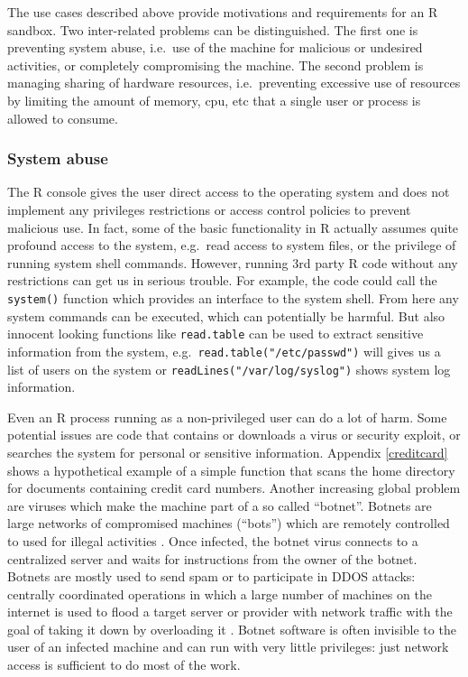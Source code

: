 \documentclass[article]{jss}
\newcommand{\R}{\textsf{R}\xspace}
\begin{document}
The use cases described above provide motivations and requirements for an
\R sandbox. Two inter-related problems can be distinguished. The first
one is preventing system abuse, i.e.\ use of the machine for malicious or
undesired activities, or completely compromising the machine. The second
problem is managing sharing of hardware resources, i.e.\ preventing excessive
use of resources by limiting the amount of memory, cpu, etc that a single user
or process is allowed to consume.

\subsubsection{System abuse}

The \R console gives the user direct access to the operating system
and does not implement any privileges restrictions or access control policies to
prevent malicious use. In fact, some of the basic functionality in \R actually
assumes quite profound access to the system, e.g.\ read access to system files,
or the privilege of running system shell commands. However, running 3rd
party \R code without any restrictions can get us in serious
trouble. For example, the code could call the \texttt{system()} function which
provides an interface to the system shell. From here any system commands can be
executed, which can potentially be harmful. But also innocent looking functions
like \texttt{read.table} can be used to extract sensitive information from the
system, e.g.\ \texttt{read.table("/etc/passwd")} will gives us a list of users
on the system or \texttt{readLines("/var/log/syslog")} shows system log
information.

Even an \R process running as a non-privileged user can do a lot of
harm. Some potential issues are code that contains or downloads a virus or
security exploit, or searches the system for personal or sensitive information.
Appendix \ref{creditcard} shows a hypothetical example of a simple function that
scans the home directory for documents containing credit card numbers. Another
increasing global problem are viruses which make the machine part of a so called
``botnet''. Botnets are large networks of compromised machines (``bots'') which
are remotely controlled to used for illegal activities
\citep{abu2006multifaceted}. Once infected, the botnet virus connects to a
centralized server and waits for instructions from the owner of the botnet.
Botnets are mostly used to send spam or to participate in DDOS attacks:
centrally coordinated operations in which a large number of machines on the
internet is used to flood a target server or provider with network traffic with
the goal of taking it down by overloading it \citep{mirkovic2004taxonomy}. Botnet
software is often invisible to the user of an infected machine and can run with
very little privileges: just network access is sufficient to do most of the work.
\end{document}
